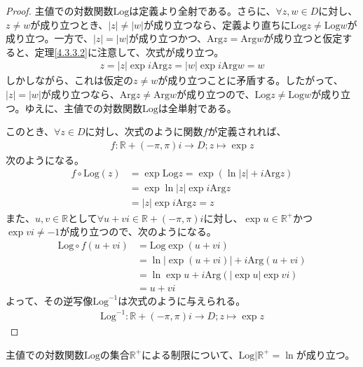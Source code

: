\documentclass[dvipdfmx]{jsarticle}
\begin{document}
\begin{proof}
主値での対数関数$\mathrm{Log}$は定義より全射である。さらに、$\forall z,w \in D$に対し、$z \neq w$が成り立つとき、$|z| \neq |w|$が成り立つなら、定義より直ちに$\mathrm{Log}z \neq \mathrm{Log}w$が成り立つ。一方で、$|z| = |w|$が成り立つかつ、$\mathrm{Arg}z = \mathrm{Arg}w$が成り立つと仮定すると、定理\ref{4.3.3.2}に注意して、次式が成り立つ。
\begin{align*}
z = |z|\exp{i\mathrm{Arg}z} = |w|\exp{i\mathrm{Arg}w} = w
\end{align*}
しかしながら、これは仮定の$z \neq w$が成り立つことに矛盾する。したがって、$|z| = |w|$が成り立つなら、$\mathrm{Arg}z \neq \mathrm{Arg}w$が成り立つので、$\mathrm{Log}z \neq \mathrm{Log}w$が成り立つ。ゆえに、主値での対数関数$\mathrm{Log}$は全単射である。\par
このとき、$\forall z \in D$に対し、次式のように関数$f$が定義されれば、
\begin{align*}
f:\mathbb{R} + ( - \pi,\pi)i \rightarrow D;z \mapsto \exp z
\end{align*}
次のようになる。
\begin{align*}
f \circ \mathrm{Log}(z) &= \exp{\mathrm{Log}z} = \exp\left( \ln|z| + i\mathrm{Arg}z \right)\\
&= \exp{\ln|z|}\exp{i\mathrm{Arg}z}\\
&= |z|\exp{i\mathrm{Arg}z} = z
\end{align*}
また、$u,v \in \mathbb{R}$として$\forall u + vi \in \mathbb{R} + ( - \pi,\pi)i$に対し、$\exp u \in \mathbb{R}^{+}$かつ$\exp{vi} \neq - 1$が成り立つので、次のようになる。
\begin{align*}
\mathrm{Log} \circ f(u + vi) &= \mathrm{Log}{\exp(u + vi)}\\
&= \ln\left| \exp(u + vi) \right| + i\mathrm{Arg}(u + vi)\\
&= \ln{\exp u} + i\mathrm{Arg}\left( \left| \exp u \right|\exp{vi} \right)\\
&= u + vi
\end{align*}
よって、その逆写像$\mathrm{Log}^{- 1}$は次式のように与えられる。
\begin{align*}
\mathrm{Log}^{- 1}:\mathbb{R} + ( - \pi,\pi)i \rightarrow D;z \mapsto \exp z
\end{align*}
\end{proof}
\begin{thm}\label{4.3.3.5}
主値での対数関数$\mathrm{Log}$の集合$\mathbb{R}^{+}$による制限について、$\mathrm{Log}|\mathbb{R}^{+} = \ln$が成り立つ。
\end{thm}
\end{document}
